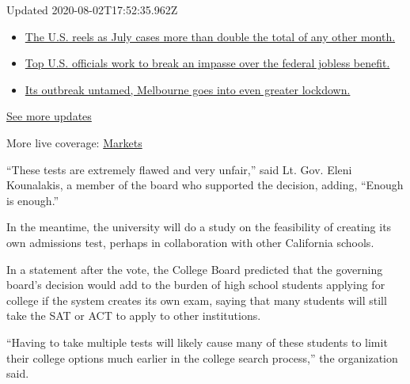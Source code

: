 Updated 2020-08-02T17:52:35.962Z

\begin{itemize}
\tightlist
\item
  \href{https://www.nytimes.com/2020/08/01/world/coronavirus-covid-19.html?action=click\&pgtype=Article\&state=default\&region=MAIN_CONTENT_1\&context=storylines_live_updates\#link-34047410}{The
  U.S. reels as July cases more than double the total of any other
  month.}
\item
  \href{https://www.nytimes.com/2020/08/01/world/coronavirus-covid-19.html?action=click\&pgtype=Article\&state=default\&region=MAIN_CONTENT_1\&context=storylines_live_updates\#link-780ec966}{Top
  U.S. officials work to break an impasse over the federal jobless
  benefit.}
\item
  \href{https://www.nytimes.com/2020/08/01/world/coronavirus-covid-19.html?action=click\&pgtype=Article\&state=default\&region=MAIN_CONTENT_1\&context=storylines_live_updates\#link-2bc8948}{Its
  outbreak untamed, Melbourne goes into even greater lockdown.}
\end{itemize}

\href{https://www.nytimes.com/2020/08/01/world/coronavirus-covid-19.html?action=click\&pgtype=Article\&state=default\&region=MAIN_CONTENT_1\&context=storylines_live_updates}{See
more updates}

More live coverage:
\href{https://www.nytimes.com/live/2020/07/31/business/stock-market-today-coronavirus?action=click\&pgtype=Article\&state=default\&region=MAIN_CONTENT_1\&context=storylines_live_updates}{Markets}

``These tests are extremely flawed and very unfair,'' said Lt. Gov.
Eleni Kounalakis, a member of the board who supported the decision,
adding, ``Enough is enough.''

In the meantime, the university will do a study on the feasibility of
creating its own admissions test, perhaps in collaboration with other
California schools.

In a statement after the vote, the College Board predicted that the
governing board's decision would add to the burden of high school
students applying for college if the system creates its own exam, saying
that many students will still take the SAT or ACT to apply to other
institutions.

``Having to take multiple tests will likely cause many of these students
to limit their college options much earlier in the college search
process,'' the organization said.


